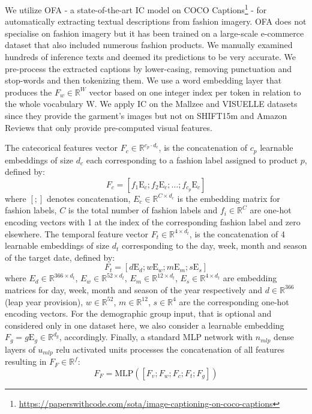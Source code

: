 \documentclass{article}
\begin{document}
We utilize OFA \cite{wang2022unifying} - a state-of-the-art IC model on COCO Captions\footnote{\url{https://paperswithcode.com/sota/image-captioning-on-coco-captions}} - for automatically extracting textual descriptions from fashion imagery. OFA does not specialise on fashion imagery but it has been trained on a large-scale e-commerce dataset that also included numerous fashion products. We manually examined hundreds of inference texts and deemed its predictions to be very accurate. 
We pre-process the extracted captions by lower-casing, removing punctuation and stop-words and then tokenizing them. 
We use a word embedding layer that produces the $F_w\in\mathbb{R}^W$ vector based on one integer index per token in relation to the whole vocabulary W.
We apply IC on the Mallzee and VISUELLE datasets since they provide the garment's images but not on SHIFT15m and Amazon Reviews that only provide pre-computed visual features.

The catecorical features vector $F_c\in\mathbb{R}^{c_p\cdot d_c}$, is the concatenation of $c_p$ learnable embeddings of size $d_c$ each corresponding to a fashion label assigned to product $p$, defined by:
\begin{equation}
F_c = [f_1\text{E}_c;f_2\text{E}_c;\dots;f_{c_p}\text{E}_c]
\end{equation}
where $[;]$ denotes concatenation, $E_c\in\mathbb{R}^{C\times d_c}$ is the embedding matrix for fashion labels, $C$ is the total number of fashion labels and $f_i\in\mathbb{R}^C$ are one-hot encoding vectors with 1 at the index of the corresponding fashion label and zero elsewhere. The temporal feature vector $F_t\in\mathbb{R}^{4\times d_t}$, is the concatenation of 4 learnable embeddings of size $d_t$ corresponding to the day, week, month and season of the target date, defined by:
\begin{equation}
F_t = [d\text{E}_d;w\text{E}_w;m\text{E}_m;s\text{E}_s]
\end{equation}
where $E_d\in\mathbb{R}^{366\times d_t}$, $E_w\in\mathbb{R}^{52\times d_t}$, $E_m\in\mathbb{R}^{12\times d_t}$, $E_s\in\mathbb{R}^{4\times d_t}$ are embedding matrices for day, week, month and season of the year respectively and $d\in\mathbb{R}^{366}$ (leap year provision), $w\in\mathbb{R}^{52}$, $m\in\mathbb{R}^{12}$, $s\in\mathbb{R}^4$ are the corresponding one-hot encoding vectors. For the demographic group input, that is optional and considered only in one dataset here, we also consider a learnable embedding $F_g=g\text{E}_g\in\mathbb{R}^{d_g}$, accordingly. Finally, a standard MLP network with $n_{mlp}$ dense layers of $u_{mlp}$ relu activated units processes the concatenation of all features resulting in $F_{F}\in\mathbb{R}^{f}$:
\begin{equation}
F_{F} = \text{MLP}([F_v;F_w;F_c;F_t;F_g])
\end{equation}
\end{document}
